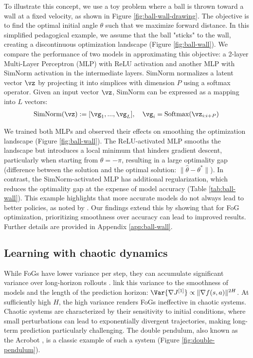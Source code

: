 \documentclass{article} %
\begin{document}
To illustrate this concept, we use a toy problem where a ball is thrown toward a wall at a fixed velocity, as shown in Figure \ref{fig:ball-wall-drawing}. The objective is to find the optimal initial angle $\theta$ such that we maximize forward distance. In this simplified pedagogical example, we assume that the ball "sticks" to the wall, creating a discontinuous optimization landscape (Figure \ref{fig:ball-wall}). We compare the performance of two models in approximating this objective: a 2-layer Multi-Layer Perceptron (MLP) with ReLU activation and another MLP with SimNorm activation \citet{hansen2023td} in the intermediate layers. SimNorm normalizes a latent vector $\vz$ by projecting it into simplices with dimension $P$ using a softmax operator. Given an input vector $\vz$, SimNorm can be expressed as a mapping into $L$ vectors: 
\begin{align} \label{eq:simnorm}
    \text{SimNorm}(\vz) := [\vg_1, ..., \vg_L], \quad \vg_i = \text{Softmax}(\vz_{i: i+P})
\end{align}

We trained both MLPs and observed their effects on smoothing the optimization landscape (Figure \ref{fig:ball-wall}). The ReLU-activated MLP smooths the landscape but introduces a local minimum that hinders gradient descent, particularly when starting from $\theta = -\pi$, resulting in a large optimality gap (difference between the solution and the optimal solution: $\| \hat{\theta} - \theta^* \|$). In contrast, the SimNorm-activated MLP has additional regularization, which reduces the optimality gap at the expense of model accuracy (Table \ref{tab:ball-wall}). This example highlights that more accurate models do not always lead to better policies, as noted by \cite{lambert2020objective}. Our findings extend this by showing that for FoG optimization, prioritizing smoothness over accuracy can lead to improved results. Further details are provided in Appendix \ref{app:ball-wall}.

\subsection{Learning with chaotic dynamics} \label{sec:learning-chaos}

While FoGs have lower variance per step, they can accumulate significant variance over long-horizon rollouts \citet{metz2021gradients}. \citet{suh2022differentiable} link this variance to the smoothness of models and the length of the prediction horizon: $\Var{\nabla J^{[1]}} \propto \| \nabla f(s,a) \|^{2H}$. At sufficiently high $H$, the high variance renders FoGs ineffective in chaotic systems. Chaotic systems are characterized by their sensitivity to initial conditions, where small perturbations can lead to exponentially divergent trajectories, making long-term prediction particularly challenging. The double pendulum, also known as the Acrobot \citet{murray1991case}, is a classic example of such a system (Figure \ref{fig:double-pendulum}).
\end{document}
